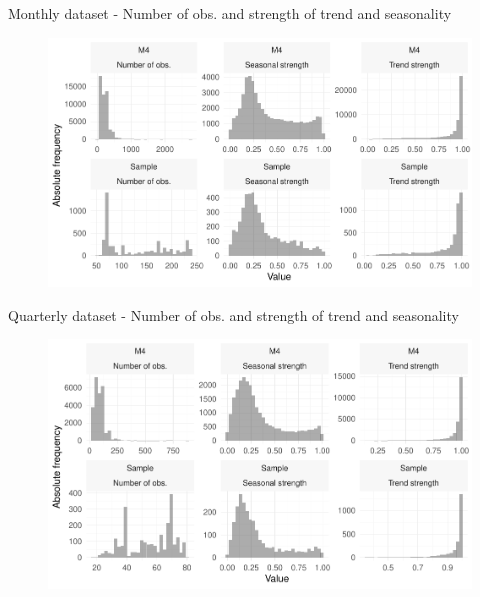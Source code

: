 \documentclass[aspectratio=169]{beamer}
\begin{document}
\begin{frame}[t]{Monthly dataset - Number of obs. and strength of trend and seasonality}
	\begin{figure}[H]
    \center
		\includegraphics[scale=0.7]{figures/figure_01_data_monthly.pdf}
	\end{figure}
\end{frame}


\begin{frame}[t]{Quarterly dataset - Number of obs. and strength of trend and seasonality}
	\begin{figure}[H]
    \center
		\includegraphics[scale=0.7]{figures/figure_02_data_quarterly.pdf}
	\end{figure}
\end{frame}
\end{document}
